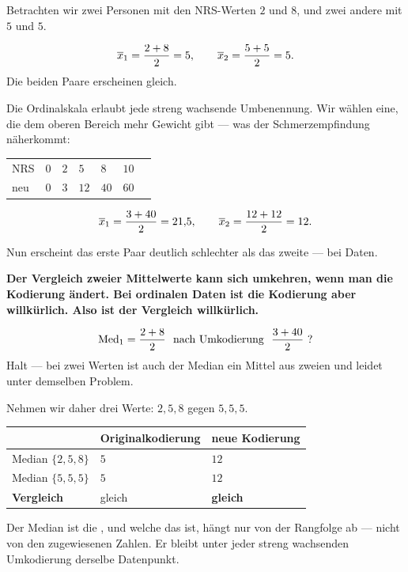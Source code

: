 \begin{merksatz}
Betrachten wir zwei Personen mit den NRS-Werten $2$ und $8$, und zwei andere mit $5$ und $5$.

\[ \overline{x}_1 = \frac{2+8}{2} = 5, \qquad \overline{x}_2 = \frac{5+5}{2} = 5 . \]
Die beiden Paare erscheinen gleich.

Die Ordinalskala erlaubt jede streng wachsende Umbenennung. Wir wählen eine, die dem oberen Bereich mehr Gewicht gibt --- was der Schmerzempfindung näherkommt:
\begin{center}
{\small
\renewcommand{\arraystretch}{1.35}
\begin{tabular}{@{}P{1.6cm}P{0.9cm}P{0.9cm}P{0.9cm}P{0.9cm}P{0.9cm}P{0.9cm}@{}}
\toprule
NRS & $0$ & $2$ & $5$ & $8$ & $10$ & \\
neu & $0$ & $3$ & $12$ & $40$ & $60$ & \\
\bottomrule
\end{tabular}}
\end{center}

\[ \overline{x}_1 = \frac{3+40}{2} = 21{,}5, \qquad \overline{x}_2 = \frac{12+12}{2} = 12 . \]

Nun erscheint das erste Paar deutlich schlechter als das zweite --- bei  Daten.

\begin{center}
\begin{minipage}{0.9\textwidth}
\textbf{Der Vergleich zweier Mittelwerte kann sich umkehren, wenn man die Kodierung ändert. Bei ordinalen Daten ist die Kodierung aber willkürlich. Also ist der Vergleich willkürlich.}
\end{minipage}
\end{center}

\[ \operatorname{Med}_1 = \frac{2+8}{2} \ \text{ nach Umkodierung } \ \frac{3+40}{2} \ ? \]
Halt --- bei zwei Werten ist auch der Median ein Mittel aus zweien und leidet unter demselben Problem.

Nehmen wir daher drei Werte: $2, 5, 8$ gegen $5,5,5$.
\begin{center}
\renewcommand{\arraystretch}{1.45}
\begin{tabular}{@{}P{2.6cm}P{2.6cm}P{2.4cm}@{}}
\toprule
& \textbf{Original\-kodierung} & \textbf{neue Kodierung}\\
\midrule
Median $\{2,5,8\}$ & $5$ & $12$\\
Median $\{5,5,5\}$ & $5$ & $12$\\
\midrule
\textbf{Vergleich} & gleich & \textcolor{gruen}{\textbf{gleich}}\\
\bottomrule
\end{tabular}
\end{center}

Der Median ist die , und welche das ist, hängt nur von der Rangfolge ab --- nicht von den zugewiesenen Zahlen. Er bleibt unter jeder streng wachsenden Umkodierung derselbe Datenpunkt.
\end{merksatz}

